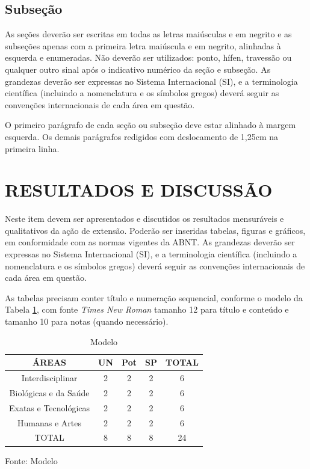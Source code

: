 \documentclass[%
  article,%
  a4paper,%
  12pt,%
  fleqn,%
  oneside,%
  chapter = TITLE,%
  section = TITLE,%
]{abntex2}
\begin{document}
\subsection{Subseção}

\begin{flushleft}%
As seções deverão ser escritas em todas as letras maiúsculas e em negrito e as subseções apenas com a primeira letra maiúscula e em negrito, alinhadas à esquerda e enumeradas. Não deverão ser utilizados: ponto, hífen, travessão ou qualquer outro sinal após o indicativo numérico da seção e subseção. As grandezas deverão ser expressas no Sistema Internacional (SI), e a terminologia científica (incluindo a nomenclatura e os símbolos gregos) deverá seguir as convenções internacionais de cada área em questão.
\end{flushleft}

O primeiro parágrafo de cada seção ou subseção deve estar alinhado à margem esquerda. Os demais parágrafos redigidos com deslocamento de 1,25cm na primeira linha.

\section{RESULTADOS E DISCUSSÃO}

\begin{flushleft}%
Neste item devem ser apresentados e discutidos os resultados mensuráveis e qualitativos da ação de extensão. Poderão ser inseridas tabelas, figuras e gráficos, em conformidade com as normas vigentes da ABNT. As grandezas deverão ser expressas no Sistema Internacional (SI), e a terminologia científica (incluindo a nomenclatura e os símbolos gregos) deverá seguir as convenções internacionais de cada área em questão.
\end{flushleft}

As tabelas precisam conter título e numeração sequencial, conforme o modelo da Tabela \ref{tab:areas}, com fonte \textit{Times New Roman} tamanho 12 para título e conteúdo e tamanho 10 para notas (quando necessário).

\begin{table}[ht]
\centering
\caption{Modelo}
\begin{tabular}{@{}ccccc@{}}
\toprule
\textbf{ÁREAS}                 & \textbf{UN} & \textbf{Pot} & \textbf{SP} & \textbf{TOTAL} \\ \midrule
Interdisciplinar      & 2  & 2   & 2  & 6     \\
Biológicas e da Saúde & 2  & 2   & 2  & 6     \\
Exatas e Tecnológicas & 2  & 2   & 2  & 6     \\
Humanas e Artes       & 2  & 2   & 2  & 6     \\ \midrule
TOTAL                 & 8  & 8   & 8  & 24    \\ \bottomrule
\end{tabular}
\newline \footnotesize	 Fonte: Modelo
\label{tab:areas}
\end{table}
\end{document}
